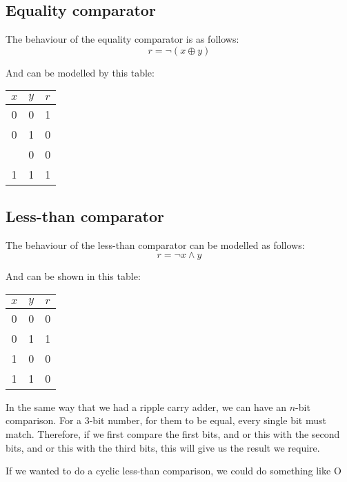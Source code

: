 \documentclass[11pt,a4paper,titlepage,dvipsnames,cmyk]{scrartcl}
\begin{document}
\subsection{Equality comparator}%
\label{sub:equality}
The behaviour of the equality comparator is as follows:
\begin{equation*}
    r = \neg (x \oplus y)
\end{equation*}

And can be modelled by this table:
\begin{center}
    \begin{tabular}{|c c|c|}
        \hline
        $x$ & $y$ & $r$ \\ \hline
        0 & 0 & 1 \\ \hline
        0 & 1 & 0 \\ \hilne
        1 & 0 & 0 \\ \hline
        1 & 1 & 1 \\ \hline
    \end{tabular}
\end{center}

\subsection{Less-than comparator}%
\label{sub:less-than}

The behaviour of the less-than comparator can be modelled as follows:
\begin{equation*}
    r = \neg x \wedge y
\end{equation*}

And can be shown in this table:
\begin{center}
    \begin{tabular}{|c c|c|}
        \hline
        $x$ & $y$ & $r$ \\ \hline
        0 & 0 & 0 \\ \hline
        0 & 1 & 1 \\ \hline
        1 & 0 & 0 \\ \hline
        1 & 1 & 0 \\ \hline
    \end{tabular}
\end{center}

In the same way that we had a ripple carry adder, we can have an $n$-bit
comparison. For a 3-bit number, for them to be equal, every single bit
must match. Therefore, if we first compare the first bits, and or this
with the second bits, and or this with the third bits, this will give us
the result we require.

If we wanted to do a cyclic less-than comparison, we could do something
like O
\end{document}
